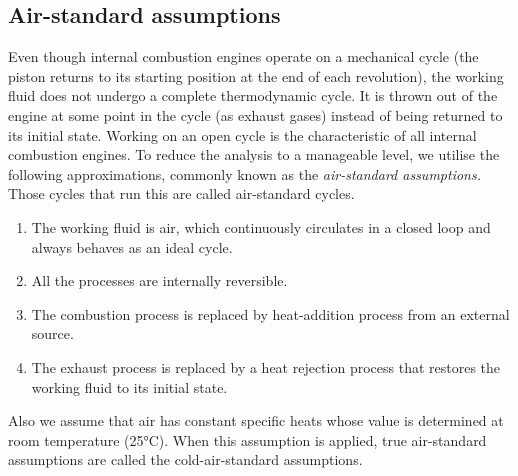 \subsection{Air-standard assumptions}
Even though internal combustion engines operate on a mechanical cycle (the piston returns to its starting position at the end of each revolution), the working fluid does not undergo a complete thermodynamic cycle. It is thrown out of the engine at some point in the cycle (as exhaust gases) instead of being returned to its initial state. Working on an open cycle is the characteristic of all internal combustion engines. To reduce the analysis to a manageable level, we utilise the following approximations, commonly known as the \emph{air-standard assumptions.} Those cycles that run this are called air-standard cycles.
\begin{enumerate}[noitemsep]
  \item The working fluid is air, which continuously circulates in a closed loop and always behaves as an ideal cycle.
  \item All the processes are internally reversible.
  \item The combustion process is replaced by heat-addition process from an external source.
  \item The exhaust process is replaced by a heat rejection process that restores the working fluid to its initial state.
\end{enumerate}
Also we assume that air has constant specific heats whose value is determined at room temperature (25\si{\celsius}). When this assumption is applied, true air-standard assumptions are called the cold-air-standard assumptions.
